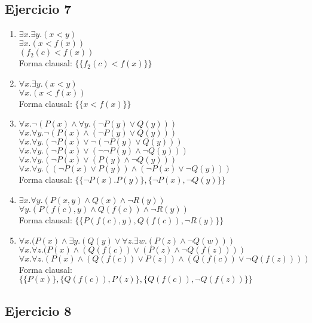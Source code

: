\documentclass[10pt,a4paper]{article}
\begin{document}
  \subsection{Ejercicio 7}
\begin{enumerate}
\item 
$\exists x. \exists y. (x<y)$ \\
$\exists x. (x<f(x))$ \\
$(f_{2}(c)<f(x))$ \\
Forma clausal: $\{\{f_{2}(c)<f(x)\}\}$
\item 
$\forall x. \exists y. (x<y)$ \\
$\forall x. (x<f(x))$ \\
Forma clausal: $\{\{x<f(x)\}\}$
\item 
$\forall x. \neg(P(x) \wedge \forall y.(\neg P(y) \vee Q(y)))$ \\
$\forall x. \forall y. \neg(P(x) \wedge (\neg P(y) \vee Q(y)))$ \\
$\forall x. \forall y. (\neg P(x) \vee \neg(\neg P(y) \vee Q(y)))$ \\
$\forall x. \forall y. (\neg P(x) \vee (\neg \neg P(y) \wedge \neg Q(y)))$ \\
$\forall x. \forall y. (\neg P(x) \vee (P(y) \wedge \neg Q(y)))$ \\
$\forall x. \forall y. ( (\neg P(x) \vee P(y)) \wedge (\neg P(x) \vee \neg Q(y) ) )$ \\
Forma clausal: $\{\{\neg P(x). P(y)\},\{\neg P(x), \neg Q(y)\}\}$
\item 
$\exists x. \forall y. (P(x,y) \wedge Q(x) \wedge \neg R(y))$ \\
$\forall y. (P(f(c),y) \wedge Q(f(c)) \wedge \neg R(y))$ \\
Forma clausal: $\{\{P(f(c),y), Q(f(c)), \neg R(y)\}\}$
\item 
$\forall x. (P(x) \wedge \exists y. (Q(y) \vee \forall z. \exists w. (P(z) \wedge \neg Q(w)))$ \\
$\forall x. \forall z. (P(x) \wedge (Q(f(c)) \vee (P(z) \wedge \neg Q(f(z))))$ \\
$\forall x. \forall z. (P(x) \wedge (Q(f(c)) \vee P(z) ) \wedge (Q(f(c)) \vee \neg Q(f(z)) ) )$ \\
Forma clausal: $\{\{ P(x)\} , \{Q(f(c)), P(z)\} , \{Q(f(c)), \neg Q(f(z))\} \}$
\end{enumerate}
  \subsection{Ejercicio 8}
\end{document}
